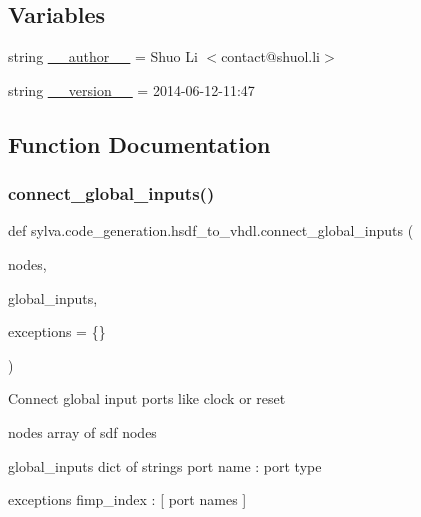 \subsection*{Variables}
\begin{DoxyCompactItemize}
\item 
string \hyperlink{namespacesylva_1_1code__generation_1_1hsdf__to__vhdl_ae3bc1b6b45064dcd26934de897ca43ce}{\+\_\+\+\_\+author\+\_\+\+\_\+} = \textquotesingle{}Shuo Li $<$contact@shuol.\+li$>$\textquotesingle{}
\item 
string \hyperlink{namespacesylva_1_1code__generation_1_1hsdf__to__vhdl_a75916eaf9006c0cce223480e45896984}{\+\_\+\+\_\+version\+\_\+\+\_\+} = \textquotesingle{}2014-\/06-\/12-\/11\+:47\textquotesingle{}
\end{DoxyCompactItemize}


\subsection{Function Documentation}
\mbox{\label{namespacesylva_1_1code__generation_1_1hsdf__to__vhdl_a4a40923ef153cf1f1a9da0c742b2e542}} 
\subsubsection{\texorpdfstring{connect\+\_\+global\+\_\+inputs()}{connect\_global\_inputs()}}
{\footnotesize\ttfamily def sylva.\+code\+\_\+generation.\+hsdf\+\_\+to\+\_\+vhdl.\+connect\+\_\+global\+\_\+inputs (\begin{DoxyParamCaption}\item[{}]{nodes,  }\item[{}]{global\+\_\+inputs,  }\item[{}]{exceptions = {\ttfamily \{\}} }\end{DoxyParamCaption})}

\begin{DoxyVerb}Connect global input ports like clock or reset

  nodes
    array of sdf nodes

  global_inputs
    dict of strings
    {port name : port type}

  exceptions
    { fimp_index : [ port names ] }
\end{DoxyVerb}
 

